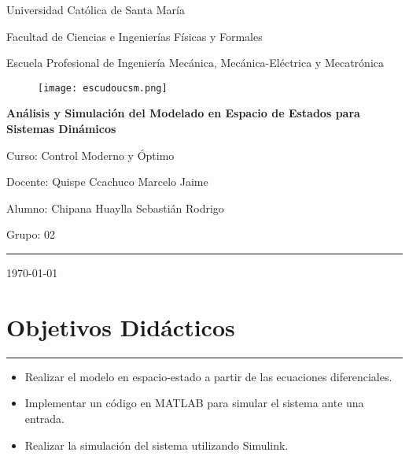 \documentclass{report}
\begin{document}
\begin{titlepage}
    \centering
    \vspace*{2cm}
    {\Large Universidad Católica de Santa María \par}
    {\Large Facultad de Ciencias e Ingenierías Físicas y Formales \par}
    {\Large Escuela Profesional de Ingeniería Mecánica, Mecánica-Eléctrica y Mecatrónica \par}

    \begin{figure}[H]
    \centering
    \texttt{[image: escudoucsm.png]}
    \end{figure}
    {\Huge \bfseries Análisis y Simulación del Modelado en Espacio de Estados para Sistemas Dinámicos \par}
    \vspace{1.5cm}
    

    {\large Curso: Control Moderno y Óptimo \par}
    {\large Docente: Quispe Ccachuco Marcelo Jaime \par}
    {\large Alumno: Chipana Huaylla Sebastián Rodrigo \par}
    {\large Grupo: 02 \par}
    \vfill
    \noindent\rule{\textwidth}{1pt} %

    {\large \today \par}
\end{titlepage}

\tableofcontents %
\listoffigures   %

\section{Objetivos Didácticos}
\noindent\rule{\textwidth}{0.4pt} %
\begin{itemize}
    \item Realizar el modelo en espacio-estado a partir de las ecuaciones diferenciales.
    \item Implementar un código en MATLAB para simular el sistema ante una entrada.
    \item Realizar la simulación del sistema utilizando Simulink.
\end{itemize}
\end{document}
